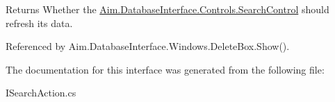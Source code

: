 \begin{DoxyReturn}{Returns}
Whether the \mbox{\hyperlink{class_aim_1_1_database_interface_1_1_controls_1_1_search_control}{Aim.\+Database\+Interface.\+Controls.\+Search\+Control}} should refresh it\textquotesingle{}s data.
\end{DoxyReturn}


Referenced by Aim.\+Database\+Interface.\+Windows.\+Delete\+Box.\+Show().



The documentation for this interface was generated from the following file\+:\begin{DoxyCompactItemize}
\item 
I\+Search\+Action.\+cs\end{DoxyCompactItemize}
